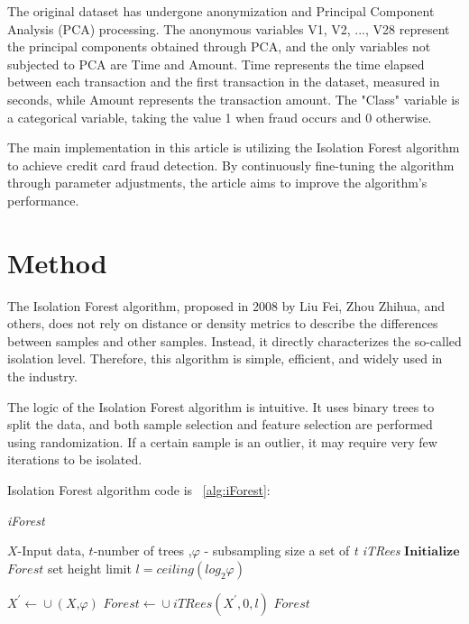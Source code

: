 
The original dataset has undergone anonymization and Principal Component Analysis (PCA) processing. The anonymous variables V1, V2, ..., V28 represent the principal components obtained through PCA, and the only variables not subjected to PCA are Time and Amount. Time represents the time elapsed between each transaction and the first transaction in the dataset, measured in seconds, while Amount represents the transaction amount. The "Class" variable is a categorical variable, taking the value 1 when fraud occurs and 0 otherwise.

The main implementation in this article is utilizing the Isolation Forest algorithm to achieve credit card fraud detection. By continuously fine-tuning the algorithm through parameter adjustments, the article aims to improve the algorithm's performance.



\section{Method} \label{sec-method}
The Isolation Forest algorithm, proposed in 2008 by Liu Fei, Zhou Zhihua, and others, does not rely on distance or density metrics to describe the differences between samples and other samples. Instead, it directly characterizes the so-called isolation level. Therefore, this algorithm is simple, efficient, and widely used in the industry.

The logic of the Isolation Forest algorithm is intuitive. It uses binary trees to split the data, and both sample selection and feature selection are performed using randomization. If a certain sample is an outlier, it may require very few iterations to be isolated.

Isolation Forest algorithm code is ~\cref{alg:iForest}:
\begin{algorithm}[!h]
	\caption{ \textit{iForest}}
	\label{alg:iForest}
	\renewcommand{\algorithmicrequire}{\textbf{Input:}}
	\renewcommand{\algorithmicensure}{\textbf{Output:}}
	
	\begin{algorithmic}[1]
		\REQUIRE $X$-Input data, $t$-number of trees ,$\varphi$ - subsampling size %
		\ENSURE a set of \textit{t iTRees}   %
		\STATE $\textbf{Initialize}$ $\textit{Forest}$
		\STATE set height limit $l = ceiling(log_{2}\varphi)$
		
		\STATE $X^{\prime}\!\leftarrow\!\cup(\textit{X,$\varphi$})$
		\STATE $\textit{Forest}\!\leftarrow\!\cup\textit{iTRees}(X^{\prime},0,\mathit{l})$
		\ENDFOR
		\RETURN $\textit{Forest}$
	\end{algorithmic}
\end{algorithm}

